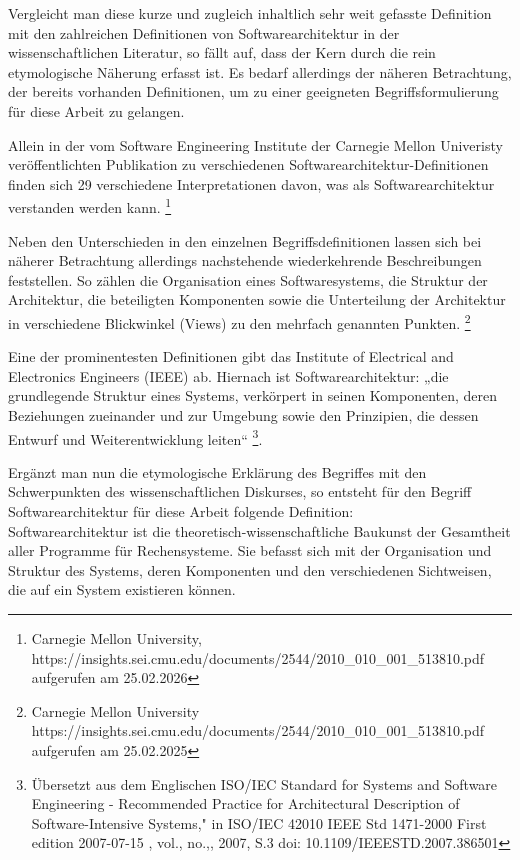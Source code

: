 Vergleicht man diese kurze und zugleich inhaltlich sehr weit gefasste Definition mit den zahlreichen Definitionen von Softwarearchitektur in der wissenschaftlichen Literatur, so fällt auf, dass der Kern durch die rein etymologische Näherung erfasst ist. Es bedarf allerdings der näheren Betrachtung, der bereits vorhanden Definitionen, um zu einer geeigneten Begriffsformulierung für diese Arbeit zu gelangen. 

Allein in der vom Software Engineering Institute der Carnegie Mellon Univeristy veröffentlichten Publikation zu verschiedenen Softwarearchitektur-Definitionen finden sich 29 verschiedene Interpretationen davon, was als Softwarearchitektur verstanden werden kann.
\footnote{Carnegie Mellon University, https://insights.sei.cmu.edu/documents/2544/2010_010_001_513810.pdf aufgerufen am 25.02.2026}  

Neben den Unterschieden in den einzelnen Begriffsdefinitionen lassen sich bei näherer Betrachtung allerdings nachstehende wiederkehrende Beschreibungen feststellen. So zählen die Organisation eines Softwaresystems, die Struktur der Architektur, die beteiligten Komponenten sowie die Unterteilung der Architektur in verschiedene Blickwinkel (Views) zu den mehrfach genannten Punkten. 
\footnote{Carnegie Mellon University https://insights.sei.cmu.edu/documents/2544/2010_010_001_513810.pdf aufgerufen am 25.02.2025}  

Eine der prominentesten Definitionen gibt das Institute of Electrical and Electronics Engineers (IEEE) ab. Hiernach ist Softwarearchitektur: „die grundlegende Struktur eines Systems, verkörpert in seinen Komponenten, deren Beziehungen zueinander und zur Umgebung sowie den Prinzipien, die dessen Entwurf und Weiterentwicklung leiten“
\footnote{Übersetzt aus dem Englischen ISO/IEC Standard for Systems and Software Engineering - Recommended Practice for Architectural Description of Software-Intensive Systems," in ISO/IEC 42010 IEEE Std 1471-2000 First edition 2007-07-15 , vol., no.,, 2007, S.3  doi: 10.1109/IEEESTD.2007.386501}.

Ergänzt man nun die etymologische Erklärung des Begriffes mit den Schwerpunkten des wissenschaftlichen Diskurses, so entsteht für den Begriff Softwarearchitektur für diese Arbeit folgende Definition:
\\

Softwarearchitektur ist die theoretisch-wissenschaftliche Baukunst der Gesamtheit aller Programme für Rechensysteme. Sie befasst sich mit der Organisation und Struktur des Systems, deren Komponenten und den verschiedenen Sichtweisen, die auf ein System existieren können.


